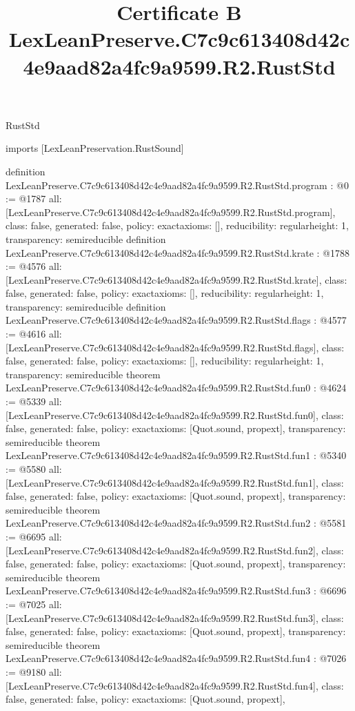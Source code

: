 \begin{lexlean}{RustStd}
\title{Certificate B LexLeanPreserve.C7c9c613408d42c4e9aad82a4fc9a9599.R2.RustStd}
\begin{coremodule}
imports [LexLeanPreservation.RustSound]

definition LexLeanPreserve.C7c9c613408d42c4e9aad82a4fc9a9599.R2.RustStd.program : @0 := @1787 {
  all: [LexLeanPreserve.C7c9c613408d42c4e9aad82a4fc9a9599.R2.RustStd.program],
  class: false,
  generated: false,
  policy: exact{axioms: []},
  reducibility: regular{height: 1},
  transparency: semireducible
}
definition LexLeanPreserve.C7c9c613408d42c4e9aad82a4fc9a9599.R2.RustStd.krate : @1788 := @4576 {
  all: [LexLeanPreserve.C7c9c613408d42c4e9aad82a4fc9a9599.R2.RustStd.krate],
  class: false,
  generated: false,
  policy: exact{axioms: []},
  reducibility: regular{height: 1},
  transparency: semireducible
}
definition LexLeanPreserve.C7c9c613408d42c4e9aad82a4fc9a9599.R2.RustStd.flags : @4577 := @4616 {
  all: [LexLeanPreserve.C7c9c613408d42c4e9aad82a4fc9a9599.R2.RustStd.flags],
  class: false,
  generated: false,
  policy: exact{axioms: []},
  reducibility: regular{height: 1},
  transparency: semireducible
}
theorem LexLeanPreserve.C7c9c613408d42c4e9aad82a4fc9a9599.R2.RustStd.fun0 : @4624 := @5339 {
  all: [LexLeanPreserve.C7c9c613408d42c4e9aad82a4fc9a9599.R2.RustStd.fun0],
  class: false,
  generated: false,
  policy: exact{axioms: [Quot.sound, propext]},
  transparency: semireducible
}
theorem LexLeanPreserve.C7c9c613408d42c4e9aad82a4fc9a9599.R2.RustStd.fun1 : @5340 := @5580 {
  all: [LexLeanPreserve.C7c9c613408d42c4e9aad82a4fc9a9599.R2.RustStd.fun1],
  class: false,
  generated: false,
  policy: exact{axioms: [Quot.sound, propext]},
  transparency: semireducible
}
theorem LexLeanPreserve.C7c9c613408d42c4e9aad82a4fc9a9599.R2.RustStd.fun2 : @5581 := @6695 {
  all: [LexLeanPreserve.C7c9c613408d42c4e9aad82a4fc9a9599.R2.RustStd.fun2],
  class: false,
  generated: false,
  policy: exact{axioms: [Quot.sound, propext]},
  transparency: semireducible
}
theorem LexLeanPreserve.C7c9c613408d42c4e9aad82a4fc9a9599.R2.RustStd.fun3 : @6696 := @7025 {
  all: [LexLeanPreserve.C7c9c613408d42c4e9aad82a4fc9a9599.R2.RustStd.fun3],
  class: false,
  generated: false,
  policy: exact{axioms: [Quot.sound, propext]},
  transparency: semireducible
}
theorem LexLeanPreserve.C7c9c613408d42c4e9aad82a4fc9a9599.R2.RustStd.fun4 : @7026 := @9180 {
  all: [LexLeanPreserve.C7c9c613408d42c4e9aad82a4fc9a9599.R2.RustStd.fun4],
  class: false,
  generated: false,
  policy: exact{axioms: [Quot.sound, propext]},
}
\end{coremodule}
\end{lexlean}
